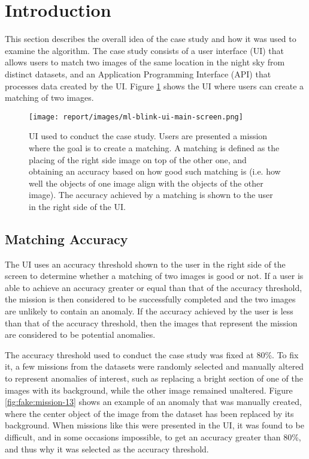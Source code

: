 \section{Introduction} \label{sect:case-study:intro}

This section describes the overall idea of the case study and how it was used to examine the \mlblink algorithm. The case study consists of a user interface (UI) that allows users to match two images of the same location in the night sky from distinct datasets, and an Application Programming Interface (API) that processes data created by the UI. Figure \ref{fig:ml-blink-ui-main-screen} shows the UI where users can create a matching of two images.

\begin{figure}[H]
  \centering
  \texttt{[image: report/images/ml-blink-ui-main-screen.png]}
  \caption{UI used to conduct the case study. Users are presented a mission where the goal is to create a matching. A matching is defined as the placing of the right side image on top of the other one, and obtaining an accuracy based on how good such matching is (i.e. how well the objects of one image align with the objects of the other image). The accuracy achieved by a matching is shown to the user in the right side of the UI.}
  \label{fig:ml-blink-ui-main-screen}
\end{figure}

\subsection{Matching Accuracy} \label{subsect:case-study:intro:matching-accuracy}
The UI uses an accuracy threshold shown to the user in the right side of the screen to determine whether a matching of two images is good or not. If a user is able to achieve an accuracy greater or equal than that of the accuracy threshold, the mission is then considered to be successfully completed and the two images are unlikely to contain an anomaly. If the accuracy achieved by the user is less than that of the accuracy threshold, then the images that represent the mission are considered to be potential anomalies.  \newline

The accuracy threshold used to conduct the case study was fixed at $80$\%. To fix it, a few missions from the datasets were randomly selected and manually altered to represent anomalies of interest, such as replacing a bright section of one of the images with its background, while the other image remained unaltered. Figure \ref{fig:fake:mission-13} shows an example of an anomaly that was manually created, where the center object of the image from the \panstarrs dataset has been replaced by its background. When missions like this were presented in the UI, it was found to be difficult, and in some occasions impossible, to get an accuracy greater than $80$\%, and thus why it was selected as the accuracy threshold.  \newline

